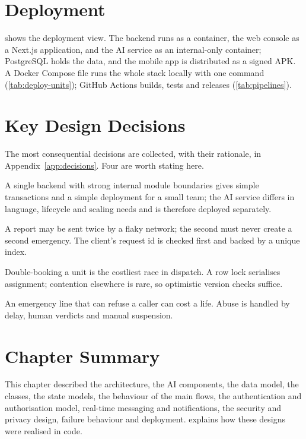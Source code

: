 

\section{Deployment}

 shows the deployment view. The backend runs as a container, the web console as a Next.js
application, and the AI service as an internal-only container; PostgreSQL holds the data, and the mobile app is
distributed as a signed APK. A Docker Compose file runs the whole stack locally with one command
(\cref{tab:deploy-units}); GitHub Actions builds, tests and releases (\cref{tab:pipelines}).




\section{Key Design Decisions}

The most consequential decisions are collected, with their rationale, in Appendix~\ref{app:decisions}. Four are worth stating here.

\begin{designnote}
A single backend with strong internal module boundaries gives simple transactions and a simple deployment for a small
team; the AI service differs in language, lifecycle and scaling needs and is therefore deployed separately.
\end{designnote}
\begin{designnote}
A report may be sent twice by a flaky network; the second must never create a second emergency. The client's request id
is checked first and backed by a unique index.
\end{designnote}
\begin{designnote}
Double-booking a unit is the costliest race in dispatch. A row lock serialises assignment; contention elsewhere is rare,
so optimistic version checks suffice.
\end{designnote}
\begin{designnote}
An emergency line that can refuse a caller can cost a life. Abuse is handled by delay, human verdicts and manual
suspension.
\end{designnote}

\section{Chapter Summary}

This chapter described the architecture, the AI components, the data model, the classes, the state models, the
behaviour of the main flows, the authentication and authorisation model, real-time messaging and notifications, the
security and privacy design, failure behaviour and deployment.  explains how these designs were
realised in code.
